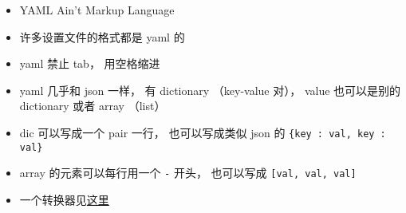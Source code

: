 
\begin{issues}
\issueDraft
\end{issues}

\begin{itemize}
\item YAML Ain't Markup Language
\item 许多设置文件的格式都是 yaml 的
\item yaml 禁止 tab， 用空格缩进
\item yaml 几乎和 json 一样， 有 dictionary （key-value 对）， value 也可以是别的 dictionary 或者 array （list）
\item dic 可以写成一个 pair 一行， 也可以写成类似 json 的 \verb|{key : val, key : val}|
\item array 的元素可以每行用一个 \verb|-| 开头， 也可以写成 \verb|[val, val, val]|
\item 一个转换器见\href{https://onlineyamltools.com/convert-yaml-to-json}{这里}
\end{itemize}
